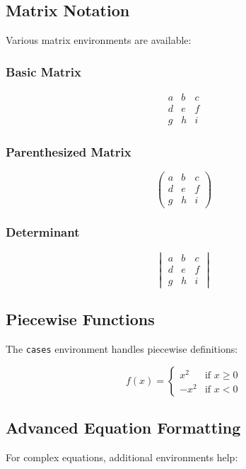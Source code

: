 \subsection{Matrix Notation}\label{subsec:matrix-notation}
Various matrix environments are available:

\subsubsection{Basic Matrix}\label{subsubsec:basic-matrix}
\[
\begin{matrix}
a & b & c \\
d & e & f \\
g & h & i
\end{matrix}
\]

\subsubsection{Parenthesized Matrix}\label{subsubsec:parenthesized-matrix}
\[
\begin{pmatrix}
a & b & c \\
d & e & f \\
g & h & i
\end{pmatrix}
\]

\subsubsection{Determinant}\label{subsubsec:determinant}
\[
\begin{vmatrix}
a & b & c \\
d & e & f \\
g & h & i
\end{vmatrix}
\]

\subsection{Piecewise Functions}\label{subsec:piecewise-functions}
The \texttt{cases} environment handles piecewise definitions:

\[
f(x) = \begin{cases}
    x^2 & \text{if $x \geq 0$} \\
    -x^2 & \text{if $x < 0$}
\end{cases}
\]

\subsection{Advanced Equation Formatting}\label{subsec:advanced-equation-formatting}
For complex equations, additional environments help:

